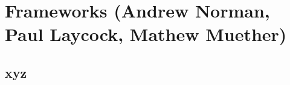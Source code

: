 \chapter{Frameworks (Andrew Norman, Paul Laycock, Mathew Muether)}
\label{ch:fworks}

\section{xyz}
\label{sec:fworks:xyz}  %

